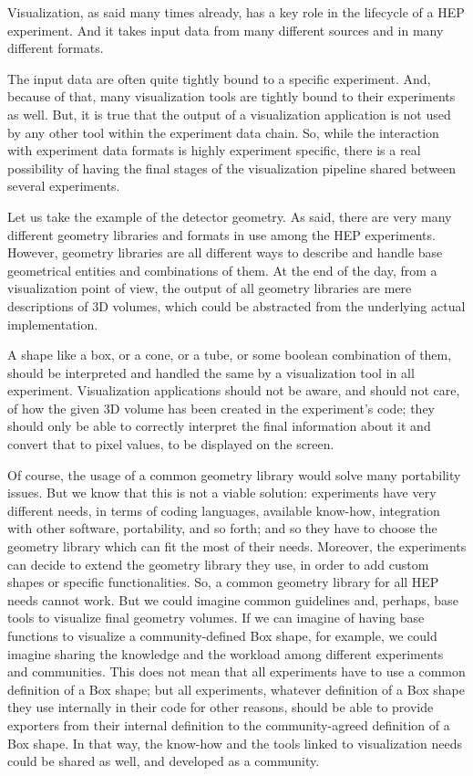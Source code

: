 \documentclass[12pt,a4paper]{article}
\begin{document}
Visualization, as said many times already, has a key role in the lifecycle of a HEP experiment. And it takes input data from many
different sources and in many different formats.

The input data are often quite tightly bound to a specific experiment. And, because of that, many visualization tools are tightly
bound to their experiments as well. But, it is true that the output of a visualization application is not used by any other tool
within the experiment data chain. So, while the interaction with experiment data formats is highly experiment specific, there is a real possibility of having the final stages of the visualization pipeline shared between several experiments.

Let us take the example of the detector geometry. As said, there are very many different geometry libraries and formats in
use among the HEP experiments. However, geometry libraries are all different ways to describe and handle base geometrical
entities and combinations of them. At the end of the day, from a visualization point of view, the output of all geometry
libraries are mere descriptions of 3D volumes, which  could be abstracted from the underlying actual implementation.

A shape like a box, or a cone, or a tube, or some boolean combination of them, should be interpreted and handled the same by a
visualization tool in all experiment. Visualization applications should not be aware, and should not care, of how  the given 3D
volume has been created in the experiment’s code; they should only be able to correctly interpret the final information about it
and convert that to pixel values, to be displayed on the screen.

Of course, the usage of a common geometry library would solve many portability issues. But we know that this is not a viable
solution: experiments have very different needs, in terms of coding languages, available know-how, integration with other
software, portability, and so forth; and so they have to choose the geometry library which can fit the most of their needs.
Moreover, the experiments can decide to extend the geometry library they use, in order to add custom shapes or specific functionalities.
So, a common geometry library for all HEP needs cannot work.
But we could imagine common guidelines and, perhaps, base tools to visualize final geometry volumes. If we can imagine of
having base functions to visualize a community-defined Box shape, for example, we could imagine sharing the knowledge and the
workload among different experiments and communities. This does not mean that all experiments have to use a common definition
of a Box shape; but all experiments, whatever definition of a Box shape they use internally in their code for other reasons,
should be able to provide exporters from their internal definition to the community-agreed definition of a Box shape.
In that way, the know-how and the tools linked to visualization needs could be shared as well, and developed as a community.
\end{document}
